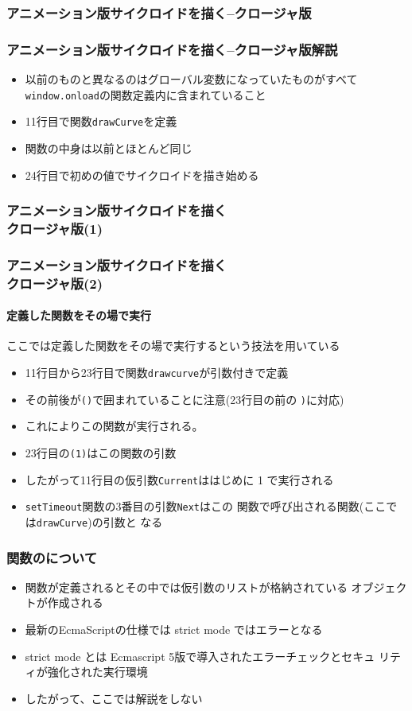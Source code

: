 \begin{frame}[containsverbatim]
 \frametitle{アニメーション版サイクロイドを描く--クロージャ版}
\end{frame}
\begin{frame}[containsverbatim]
 \frametitle{アニメーション版サイクロイドを描く--クロージャ版解説}
 \begin{itemize}
	\item 以前のものと異なるのはグローバル変数になっていたものがすべて
				\Verb+window.onload+の関数定義内に含まれていること
	\item 11行目で関数\Verb+drawCurve+を定義
	\item 関数の中身は以前とほとんど同じ
	\item 24行目で初めの値でサイクロイドを描き始める
 \end{itemize}
\end{frame}
\begin{frame}[containsverbatim]
 \frametitle{アニメーション版サイクロイドを描く\\クロージャ版(1)}
\end{frame}
\begin{frame}[containsverbatim]
 \frametitle{アニメーション版サイクロイドを描く\\クロージャ版(2)}
 \framesubtitle{定義した関数をその場で実行}
 ここでは定義した関数をその場で実行するという技法を用いている
 \begin{itemize}
	\item 11行目から23行目で関数\texttt{drawcurve}が引数付きで定義
	\item その前後が\Verb+()+で囲まれていることに注意(23行目の前の
				\texttt{)}に対応)
	\item これによりこの関数が実行される。
	\item 23行目の\Verb+(1)+はこの関数の引数
	\item したがって11行目の仮引数\Verb+Current+ははじめに 1 で実行される
	\item \Verb+setTimeout+関数の3番目の引数\Verb+Next+はこの%
				関数で呼び出される関数(ここでは\Verb+drawCurve+)の引数と
				なる
 \end{itemize}
\end{frame}
\begin{frame}[containsverbatim]
 \frametitle{関数のについて}
 \begin{itemize}
	\item 関数が定義されるとその中では仮引数のリストが格納されている
				オブジェクトが作成される
	\item 最新のEcmaScriptの仕様では strict mode ではエラーとなる
	\item strict mode とは Ecmascript 5版で導入されたエラーチェックとセキュ
				リティが強化された実行環境
	\item したがって、ここでは解説をしない
 \end{itemize}
\end{frame}
